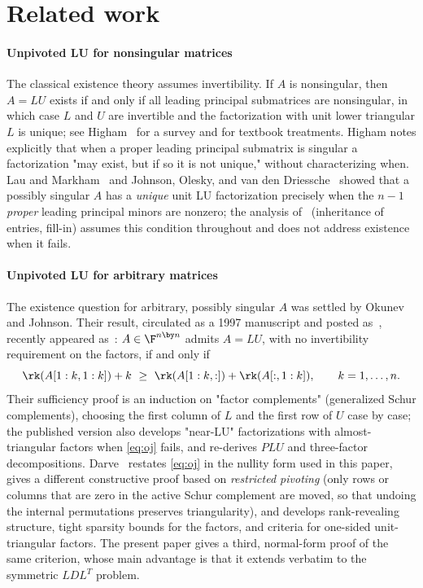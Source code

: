 \section{Related work}\label{sec:related}

\paragraph{Unpivoted LU for nonsingular matrices}
The classical existence theory assumes invertibility.  If $A$ is nonsingular,
then $A = LU$ exists if and only if all leading principal submatrices are
nonsingular, in which case $L$ and $U$ are invertible and the factorization
with unit lower triangular $L$ is unique; see
Higham~\cite{higham_gaussian_2011} for a survey and
\cite{golub_matrix_2013} for textbook treatments.  Higham notes explicitly
that when a proper leading principal submatrix is singular a factorization
"may exist, but if so it is not unique," without characterizing when.  Lau
and Markham~\cite{lau_markham_1979} and Johnson, Olesky, and van den
Driessche~\cite{johnson_inherited_1989} showed that a possibly singular $A$
has a \emph{unique} unit LU factorization precisely when the $n-1$
\emph{proper} leading principal minors are nonzero; the analysis
of~\cite{johnson_inherited_1989} (inheritance of entries, fill-in) assumes
this condition throughout and does not address existence when it fails.

\paragraph{Unpivoted LU for arbitrary matrices}
The existence question for arbitrary, possibly singular $A$ was settled by
Okunev and Johnson.  Their result, circulated as a 1997 manuscript and posted
as~\cite{okunev_johnson_2005}, recently appeared
as~\cite{johnson_okunev_2025}: $A \in \F^{n \by n}$ admits $A = LU$, with no
invertibility requirement on the factors, if and only if
\begin{equation}\label{eq:oj}
  \rk(A[1:k,1:k]) + k \ \ge\ \rk(A[1:k,:]) + \rk(A[:,1:k]),
  \qquad k = 1, \ldots, n .
\end{equation}
Their sufficiency proof is an induction on "factor complements"
(generalized Schur complements), choosing the first column of $L$ and the
first row of $U$ case by case; the published version also develops
"near-LU" factorizations with almost-triangular factors when \cref{eq:oj}
fails, and re-derives $PLU$ and three-factor decompositions.
Darve~\cite{darve_lu_2026} restates \cref{eq:oj} in the nullity form used in
this paper, gives a different constructive proof based on \emph{restricted
pivoting} (only rows or columns that are zero in the active Schur complement
are moved, so that undoing the internal permutations preserves
triangularity), and develops rank-revealing structure, tight sparsity bounds
for the factors, and criteria for one-sided unit-triangular factors.  The
present paper gives a third, normal-form proof of the same criterion, whose
main advantage is that it extends verbatim to the symmetric $LDL^T$ problem.

